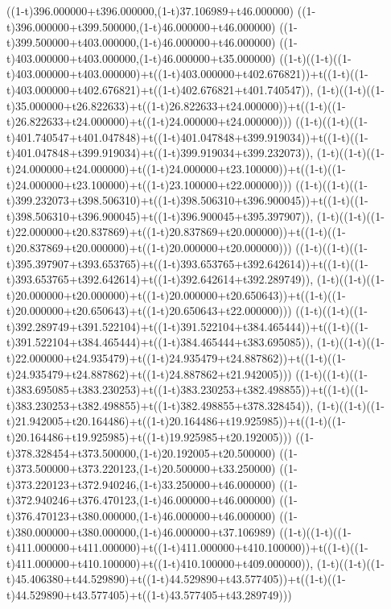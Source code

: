 ((1-t)396.000000+t396.000000,(1-t)37.106989+t46.000000)
((1-t)396.000000+t399.500000,(1-t)46.000000+t46.000000)
((1-t)399.500000+t403.000000,(1-t)46.000000+t46.000000)
((1-t)403.000000+t403.000000,(1-t)46.000000+t35.000000)
((1-t)((1-t)((1-t)403.000000+t403.000000)+t((1-t)403.000000+t402.676821))+t((1-t)((1-t)403.000000+t402.676821)+t((1-t)402.676821+t401.740547)),                                     (1-t)((1-t)((1-t)35.000000+t26.822633)+t((1-t)26.822633+t24.000000))+t((1-t)((1-t)26.822633+t24.000000)+t((1-t)24.000000+t24.000000)))
((1-t)((1-t)((1-t)401.740547+t401.047848)+t((1-t)401.047848+t399.919034))+t((1-t)((1-t)401.047848+t399.919034)+t((1-t)399.919034+t399.232073)),                                     (1-t)((1-t)((1-t)24.000000+t24.000000)+t((1-t)24.000000+t23.100000))+t((1-t)((1-t)24.000000+t23.100000)+t((1-t)23.100000+t22.000000)))
((1-t)((1-t)((1-t)399.232073+t398.506310)+t((1-t)398.506310+t396.900045))+t((1-t)((1-t)398.506310+t396.900045)+t((1-t)396.900045+t395.397907)),                                     (1-t)((1-t)((1-t)22.000000+t20.837869)+t((1-t)20.837869+t20.000000))+t((1-t)((1-t)20.837869+t20.000000)+t((1-t)20.000000+t20.000000)))
((1-t)((1-t)((1-t)395.397907+t393.653765)+t((1-t)393.653765+t392.642614))+t((1-t)((1-t)393.653765+t392.642614)+t((1-t)392.642614+t392.289749)),                                     (1-t)((1-t)((1-t)20.000000+t20.000000)+t((1-t)20.000000+t20.650643))+t((1-t)((1-t)20.000000+t20.650643)+t((1-t)20.650643+t22.000000)))
((1-t)((1-t)((1-t)392.289749+t391.522104)+t((1-t)391.522104+t384.465444))+t((1-t)((1-t)391.522104+t384.465444)+t((1-t)384.465444+t383.695085)),                                     (1-t)((1-t)((1-t)22.000000+t24.935479)+t((1-t)24.935479+t24.887862))+t((1-t)((1-t)24.935479+t24.887862)+t((1-t)24.887862+t21.942005)))
((1-t)((1-t)((1-t)383.695085+t383.230253)+t((1-t)383.230253+t382.498855))+t((1-t)((1-t)383.230253+t382.498855)+t((1-t)382.498855+t378.328454)),                                     (1-t)((1-t)((1-t)21.942005+t20.164486)+t((1-t)20.164486+t19.925985))+t((1-t)((1-t)20.164486+t19.925985)+t((1-t)19.925985+t20.192005)))
((1-t)378.328454+t373.500000,(1-t)20.192005+t20.500000)
((1-t)373.500000+t373.220123,(1-t)20.500000+t33.250000)
((1-t)373.220123+t372.940246,(1-t)33.250000+t46.000000)
((1-t)372.940246+t376.470123,(1-t)46.000000+t46.000000)
((1-t)376.470123+t380.000000,(1-t)46.000000+t46.000000)
((1-t)380.000000+t380.000000,(1-t)46.000000+t37.106989)
((1-t)((1-t)((1-t)411.000000+t411.000000)+t((1-t)411.000000+t410.100000))+t((1-t)((1-t)411.000000+t410.100000)+t((1-t)410.100000+t409.000000)),                                     (1-t)((1-t)((1-t)45.406380+t44.529890)+t((1-t)44.529890+t43.577405))+t((1-t)((1-t)44.529890+t43.577405)+t((1-t)43.577405+t43.289749)))
